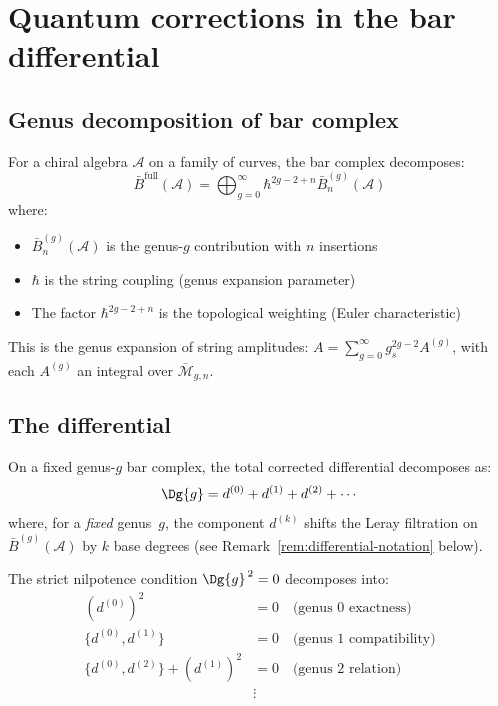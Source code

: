 \section{Quantum corrections in the bar differential}
\label{sec:quantum-corrections-bar}

\subsection{Genus decomposition of bar complex}

\begin{definition}
\label{def:genus-stratified-bar}
\label{def:geometric-bar-genus-stratified}
For a chiral algebra $\mathcal{A}$ on a family of curves, the bar complex decomposes:
\begin{equation}
\bar{B}^{\text{full}}(\mathcal{A}) = \bigoplus_{g=0}^\infty \hbar^{2g-2+n} \bar{B}^{(g)}_n(\mathcal{A})
\end{equation}
where:
\begin{itemize}
\item $\bar{B}^{(g)}_n(\mathcal{A})$ is the genus-$g$ contribution with $n$ insertions
\item $\hbar$ is the string coupling (genus expansion parameter)
\item The factor $\hbar^{2g-2+n}$ is the topological weighting (Euler characteristic)
\end{itemize}
\end{definition}

\begin{remark}
\label{rem:string-theory-genus}
This is the genus expansion of string amplitudes:
$A = \sum_{g=0}^\infty g_s^{2g-2} A^{(g)}$, with each $A^{(g)}$ an integral over $\overline{\mathcal{M}}_{g,n}$.
\end{remark}

\subsection{The differential}

\begin{theorem}
\label{thm:genus-differential}
On a fixed genus-$g$ bar complex, the total corrected differential
decomposes as:
\begin{equation}
\Dg{g} = d^{(0)} + d^{(1)} + d^{(2)} + \cdots
\end{equation}
where, for a \emph{fixed} genus~$g$, the component $d^{(k)}$ shifts the Leray filtration
on $\bar{B}^{(g)}(\mathcal{A})$ by $k$ base degrees
(see Remark~\ref{rem:differential-notation} below).

The strict nilpotence condition $\Dg{g}^{\,2} = 0$ decomposes into:
\begin{align}
(d^{(0)})^2 &= 0 \quad \text{(genus 0 exactness)}\\
\{d^{(0)}, d^{(1)}\} &= 0 \quad \text{(genus 1 compatibility)}\\
\{d^{(0)}, d^{(2)}\} + (d^{(1)})^2 &= 0 \quad \text{(genus 2 relation)}\\
&\vdots
\end{align}
\end{theorem}

